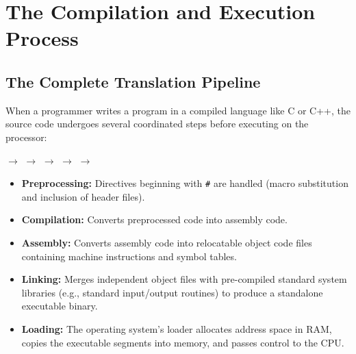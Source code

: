 \section{The Compilation and Execution Process}

\subsection{The Complete Translation Pipeline}
When a programmer writes a program in a compiled language like C or C++, the source code undergoes several coordinated steps before executing on the processor:

\begin{center}
 $\longrightarrow$
 $\longrightarrow$
 $\longrightarrow$
 $\longrightarrow$
 $\longrightarrow$
\end{center}

\begin{itemize}[leftmargin=1.2em]
    \item \textbf{Preprocessing:} Directives beginning with \texttt{\#} are handled (macro substitution and inclusion of header files).
    \item \textbf{Compilation:} Converts preprocessed code into assembly code.
    \item \textbf{Assembly:} Converts assembly code into relocatable object code files containing machine instructions and symbol tables.
    \item \textbf{Linking:} Merges independent object files with pre-compiled standard system libraries (e.g., standard input/output routines) to produce a standalone executable binary.
    \item \textbf{Loading:} The operating system's loader allocates address space in RAM, copies the executable segments into memory, and passes control to the CPU.
\end{itemize}

